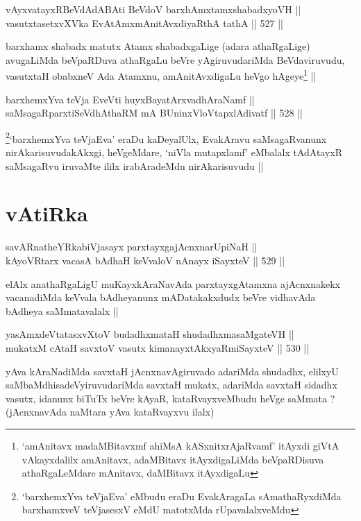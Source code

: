 
\begin{shl}
vAyxvatayxRBeVdAdABAti BeVdoV barxhAmxtamxshabadxyoVH ||  \\
vasutxtasetxvXVka EvA\s \s tAmx\s mAnitAvxdiyaRthA tathA ||  527 ||  
\end{shl}

\begin{artha}
barxhamx shabadx matutx Atamx shabadxgaLige (adara athaRgaLige)
avugaLiMda beVpaRDuva athaRgaLu beVre yAgiruvudariMda BeVdaviruvudu,
vasutxtaH obabxneV Ada Atamxnu, amAnitAvxdigaLu heVgo
hAgeye\footnote{`amAnitavx madaMBitavxmf ahiMsA kASxnitxrAjaRvamf'
  itAyxdi giVtA vAkayxdalilx amAnitavx, adaMBitavx itAyxdigaLiMda
  beVpaRDisuva athaRgaLeMdare mAnitavx, daMBitavx itAyxdigaLu} ||
\end{artha}

\begin{shl}
barxhemxYva teVja EveVti huyxBayatArxvadhAraNamf ||  \\
saMsagaRparxtiSeVdhAthaRM mA BUninxVloVtapxlAdivatf ||  528 ||  
\end{shl}

\begin{artha}
\footnote{`barxhemxYva teVjaEva' eMbudu eraDu EvakAragaLa
  sAmathaRyxdiMda barxhamxveV teVjasesxV eMdU matotxMda rUpavalalxveMdu}`barxhemxYva teVjaEva' eraDu kaDeyalUlx, EvakAravu
saMsagaRvanunx nirAkarisuvudakAkxgi, heVgeMdare, `niVla mutapxlamf'
eMbalalx tAdAtayxR saMsagaRvu iruvaMte ililx irabAradeMdu
nirAkarisuvudu ||
\end{artha}

\section*{vAtiRka}

\begin{shl}
savARnatheYRkabiVjasayx parxtayxgajAcnxnarUpiNaH || \\
kAyoVR\s tarx vacasA bAdhaH keVvaloV nAnayx iSayxteV ||  529 ||  
\end{shl}

\begin{artha}
elAlx anathaRgaLigU muKayxkAraNavAda parxtayxgAtamxna ajAcnxnakekx
vacanadiMda keVvala bAdheyanunx mADatakakxdudx beVre vidhavAda bAdheya
saMmatavalalx ||
\end{artha}

\begin{shl}
yasAmxdeVtatasxvXtoV budadhxmataH shudadhxmasaMgateVH || \\
mukatxM cAtaH savxtoV vasutx kimanayxtAkxyaRmiSayxteV ||  530 ||  
\end{shl}

\begin{artha}
yAva kAraNadiMda savxtaH jAcnxnavAgiruvado adariMda shudadhx, elilxyU
saMbaMdhisadeVyiruvudariMda savxtaH mukatx, adariMda savxtaH sidadhx
vasutx, idanunx biTuTx beVre kAyaR, kataRvayxveMbudu heVge saMmata ?
(jAcnxnavAda naMtara yAva kataRvayxvu ilalx)
\end{artha}

